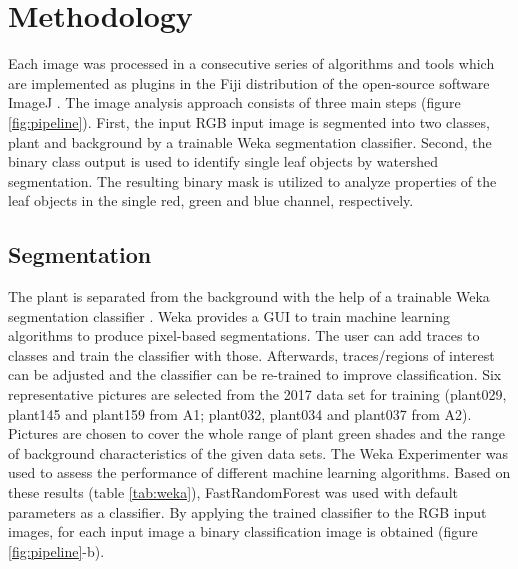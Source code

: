 \documentclass[paper=A4,bibliography=totocnumbered]{scrartcl}
\begin{document}
\clearpage
\section{Methodology}
Each image was processed in a consecutive series of algorithms and tools which are implemented as plugins in the Fiji distribution \citep{Schindelin.2012} of the open-source software ImageJ \citep{Rueden.2017}. The image analysis approach consists of three main steps (figure \ref{fig:pipeline}). First, the input RGB input image is segmented into two classes, plant and background by a trainable Weka segmentation classifier. Second, the binary class output is used to identify single leaf objects by watershed segmentation. The resulting binary mask is utilized to analyze properties of the leaf objects in the single red, green and blue channel, respectively.

\subsection{Segmentation}
The plant is separated from the background with the help of a trainable Weka segmentation classifier \citep{ArgandaCarreras.2017}. Weka provides a GUI to train machine learning algorithms to produce pixel-based segmentations. The user can add traces to classes and train the classifier with those. Afterwards, traces/regions of interest can be adjusted and the classifier can be re-trained to improve classification. Six representative pictures are selected from the 2017 data set for training (plant029, plant145 and plant159 from A1; plant032, plant034 and plant037 from A2). Pictures are chosen to cover the whole range of plant green shades and the range of background characteristics of the given data sets. The Weka Experimenter was used to assess the performance of different machine learning algorithms. Based on these results (table \ref{tab:weka}), FastRandomForest was used with default parameters as a classifier. By applying the trained classifier to the RGB input images, for each input image a binary classification image is obtained (figure \ref{fig:pipeline}-b). 
\end{document}
